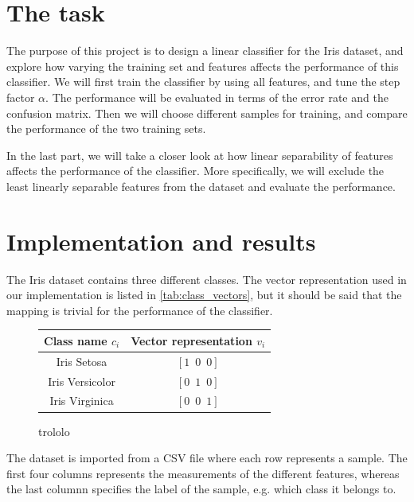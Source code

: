 \documentclass{article}
\begin{document}
\section{The task}\label{sec:task}

The purpose of this project is to design a linear classifier for the Iris dataset,
and explore how varying the training set and features affects the performance of
this classifier. We will first train the classifier by using all features, and tune
the step factor $\alpha$. The performance will be evaluated in terms of the error
rate and the confusion matrix. Then we will choose different samples for training,
and compare the performance of the two training sets.

In the last part, we will take a closer look at how linear separability of features
affects the performance of the classifier. More specifically, we will exclude the
least linearly separable features from the dataset and evaluate the performance.

\section{Implementation and results}\label{sec:implementation_and_results}

The Iris dataset contains three different classes. The vector representation used
in our implementation is listed in \autoref{tab:class_vectors}, but it should be
said that the mapping is trivial for the performance of the classifier.

\begin{figure}
    \centering
    \begin{tabular}{ | c | c | }
        \hline
        Class name $c_i$ & Vector representation $v_i$ \\
        \hline
        Iris Setosa & $[1 \enspace 0 \enspace 0]$ \\
        Iris Versicolor & $[0 \enspace 1 \enspace 0]$ \\
        Iris Virginica & $[0 \enspace 0 \enspace 1]$ \\
        \hline
    \end{tabular}
    \caption{trololo}
    \label{tab:class_vectors}
\end{figure}

The dataset is imported from a CSV file where each row represents a sample. The first four columns
represents the measurements of the different features, whereas the last columnn specifies the label of
the sample, e.g. which class it belongs to.
\end{document}
